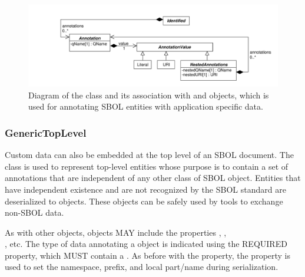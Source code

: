 \begin{figure}[!ht]
\begin{center}
\includegraphics[scale=0.525]{uml/identified_annotations}
\caption[]{Diagram of the  class and its association with  and  objects, which is used for annotating SBOL entities with application specific data.}
\label{uml:identified_annotations}
\end{center}
\end{figure}

\subsubsection{GenericTopLevel}
\label{sec:GenericTopLevel}
\label{sec:rdfType}

Custom data can also be embedded at the top level of an SBOL document. The  class is used to represent top-level entities whose purpose is to contain a set of annotations that are independent of any other class of SBOL object.
Entities that have independent existence and are not recognized by the SBOL standard are deserialized to  objects.
These  objects can be safely used by tools to exchange non-SBOL data.

As with other  objects,  objects MAY include the properties , ,\\ , etc. The type of data annotating a  object is indicated using the REQUIRED  property, which MUST contain a . As before with the  property, the  property is used to set the namespace, prefix, and local part/name during serialization.

